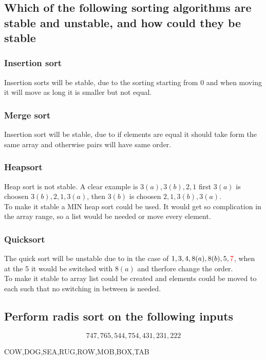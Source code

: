 \documentclass[12pt, a4paper]{article}
\begin{document}
			\subsection{Which of the following sorting algorithms are stable and unstable, and how could they be stable}
				\subsubsection{Insertion sort}
					Insertion sorts will be stable, due to the sorting starting from 0 and when moving it will move as long it is smaller but not equal.
				\subsubsection{Merge sort}
					Insertion sort will be stable, due to if elements are equal it should take form the same array and otherwise pairs will have same order.
				\subsubsection{Heapsort}
					Heap sort is not stable. A clear example is $3(a),3(b),2,1$ first $3(a)$ is choosen $3(b),2,1,3(a)$, then $3(b)$ is choosen $2,1,3(b),3(a)$.\\
					To make it stable a MIN heap sort could be used. It would get so complication in the array range, so a list would be needed or move every element.
				\subsubsection{Quicksort}
					The quick sort will be unstable due to in the case of $1,3,4,8(a),8(b),5,\color{red}7\color{black}$, when at the 5 it would be switched with $8(a)$ and therfore change the order.\\
					To make it stable to array list could be created and elements could be moved to each such that no switching in between is needed.
			\subsection{Perform radis sort on the following inputs}
				$$747,765,544,754,431,231,222$$
				\begin{center}
					COW,DOG,SEA,RUG,ROW,MOB,BOX,TAB
				\end{center}
\end{document}
